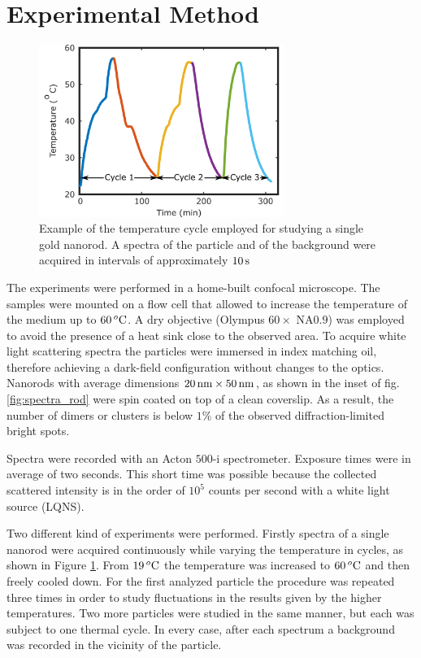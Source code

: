 \section{Experimental Method}
\begin{figure}[htp] \centering
\includegraphics[width=8cm]{Chapters/05_WhiteLight/Figures/Supplementary/01_Temp_Cycle/01_Temp_Cycle.png}
\caption{Example of the temperature cycle employed for studying a single gold
nanorod. A spectra of the particle and of the background were acquired in
intervals of approximately $10\,\textrm{s}$}
	\label{fig:temp-cycle}
\end{figure}

The experiments were performed in a home-built confocal microscope. The samples
were mounted on a flow cell that allowed to increase the temperature of the
medium up to $60\,^o\textrm{C}$. A dry objective (Olympus $60\times$ NA$0.9$) was
employed to avoid the presence of a heat sink close to the observed area. To
acquire white light scattering spectra the particles were immersed in index
matching oil, therefore achieving a dark-field configuration without changes to
the optics. Nanorods with average dimensions $20\,\textrm{nm}\times50\,\textrm{nm}$, as shown in the
inset of fig. \ref{fig:spectra_rod} were spin coated on top of a clean
coverslip. As a result, the number of dimers or clusters is below $1\%$ of the
observed diffraction-limited bright spots.

Spectra were recorded with an Acton $500\textrm{-i}$ spectrometer. Exposure
times were in average of two seconds. This short time was possible because the
collected scattered intensity is in the order of $10^5$ counts per second with a
white light source (LQNS).

Two different kind of experiments were performed. Firstly spectra of a single
nanorod were acquired continuously while varying the temperature in cycles, as
shown in Figure \ref{fig:temp-cycle}. From $19\,^o\textrm{C}$ the temperature was
increased to $60\,^o\textrm{C}$ and then freely cooled down. For the first analyzed
particle the procedure was repeated three times in order to study fluctuations
in the results given by the higher temperatures. Two more particles were studied
in the same manner, but each was subject to one thermal cycle. In every case,
after each spectrum a background was recorded in the vicinity of the particle.
 
